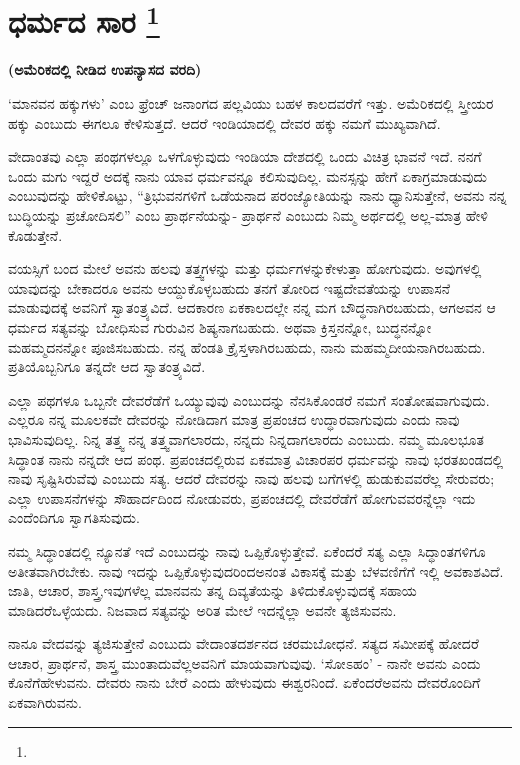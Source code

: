 
\vspace{-0.8cm}

\chapter[ಧರ್ಮದ ಸಾರ ]{ಧರ್ಮದ ಸಾರ \protect\footnote{}}

\centerline{\textbf{(ಅಮೆರಿಕದಲ್ಲಿ ನೀಡಿದ ಉಪನ್ಯಾಸದ ವರದಿ)}}

‘ಮಾನವನ ಹಕ್ಕುಗಳು’ ಎಂಬ ಫ್ರೆಂಚ್​ ಜನಾಂಗದ ಪಲ್ಲವಿಯು ಬಹಳ ಕಾಲದವರೆಗೆ ಇತ್ತು. ಅಮೆರಿಕದಲ್ಲಿ ಸ್ತ್ರೀಯರ ಹಕ್ಕು ಎಂಬುದು ಈಗಲೂ ಕೇಳಿಸುತ್ತದೆ. ಆದರೆ ಇಂಡಿಯಾದಲ್ಲಿ ದೇವರ ಹಕ್ಕು ನಮಗೆ ಮುಖ್ಯವಾಗಿದೆ.

ವೇದಾಂತವು ಎಲ್ಲಾ ಪಂಥಗಳಲ್ಲೂ ಒಳಗೊಳ್ಳುವುದು ಇಂಡಿಯಾ ದೇಶದಲ್ಲಿ ಒಂದು ವಿಚಿತ್ರ ಭಾವನೆ ಇದೆ. ನನಗೆ ಒಂದು ಮಗು ಇದ್ದರೆ ಅದಕ್ಕೆ ನಾನು ಯಾವ ಧರ್ಮವನ್ನೂ ಕಲಿಸುವುದಿಲ್ಲ. ಮನಸ್ಸನ್ನು ಹೇಗೆ ಏಕಾಗ್ರಮಾಡುವುದು ಎಂಬುವುದನ್ನು ಹೇಳಿಕೊಟ್ಟು, “ತ್ರಿಭುವನಗಳಿಗೆ ಒಡೆಯನಾದ ಪರಂಜ್ಯೋತಿಯನ್ನು ನಾನು ಧ್ಯಾನಿಸುತ್ತೇನೆ, ಅವನು ನನ್ನ ಬುದ್ಧಿಯನ್ನು ಪ್ರಚೋದಿಸಲಿ” ಎಂಬ ಪ್ರಾರ್ಥನೆಯನ್ನು- ಪ್ರಾರ್ಥನೆ ಎಂಬುದು ನಿಮ್ಮ ಅರ್ಥದಲ್ಲಿ ಅಲ್ಲ-ಮಾತ್ರ ಹೇಳಿ ಕೊಡುತ್ತೇನೆ.

ವಯಸ್ಸಿಗೆ ಬಂದ ಮೇಲೆ ಅವನು ಹಲವು ತತ್ತ್ವಗಳನ್ನು ಮತ್ತು ಧರ್ಮಗಳನ್ನು\break ಕೇಳುತ್ತಾ ಹೋಗುವುದು. ಅವುಗಳಲ್ಲಿ ಯಾವುದನ್ನು ಬೇಕಾದರೂ ಅವನು ಆಯ್ದುಕೊಳ್ಳ\-ಬಹುದು ತನಗೆ ತೋರಿದ ಇಷ್ಟದೇವತೆಯನ್ನು ಉಪಾಸನೆ ಮಾಡುವುದಕ್ಕೆ ಅವನಿಗೆ ಸ್ವಾತಂತ್ರ್ಯವಿದೆ. ಆದಕಾರಣ ಏಕಕಾಲದಲ್ಲೇ ನನ್ನ ಮಗ ಬೌದ್ಧನಾಗಿರಬಹುದು, ಆಗ\break ಅವನ ಆ ಧರ್ಮದ ಸತ್ಯವನ್ನು ಬೋಧಿಸುವ ಗುರುವಿನ ಶಿಷ್ಯನಾಗಬಹುದು. ಅಥವಾ ಕ್ರಿಸ್ತನನ್ನೋ, ಬುದ್ಧನನ್ನೋ ಮಹಮ್ಮದನನ್ನೋ ಪೂಜಿಸಬಹುದು. ನನ್ನ ಹೆಂಡತಿ ಕ್ರೈಸ್ತಳಾಗಿರ\break ಬಹುದು, ನಾನು ಮಹಮ್ಮದೀಯನಾಗಿರಬಹುದು. ಪ್ರತಿಯೊಬ್ಬನಿಗೂ ತನ್ನದೇ ಆದ ಸ್ವಾತಂತ್ರ್ಯವಿದೆ.

ಎಲ್ಲಾ ಪಥಗಳೂ ಒಬ್ಬನೇ ದೇವರೆಡೆಗೆ ಒಯ್ಯುವುವು ಎಂಬುದನ್ನು ನೆನಸಿಕೊಂಡರೆ ನಮಗೆ ಸಂತೋಷವಾಗುವುದು. ಎಲ್ಲರೂ ನನ್ನ ಮೂಲಕವೇ ದೇವರನ್ನು ನೋಡಿದಾಗ ಮಾತ್ರ ಪ್ರಪಂಚದ ಉದ್ಧಾರವಾಗುವುದು ಎಂದು ನಾವು ಭಾವಿಸುವುದಿಲ್ಲ. ನಿನ್ನ ತತ್ತ್ವ ನನ್ನ ತತ್ತ್ವವಾಗಲಾರದು, ನನ್ನದು ನಿನ್ನದಾಗಲಾರದು ಎಂಬುದು. ನಮ್ಮ ಮೂಲಭೂತ ಸಿದ್ಧಾಂತ ನಾನು ನನ್ನದೇ ಆದ ಪಂಥ. ಪ್ರಪಂಚದಲ್ಲಿರುವ ಏಕಮಾತ್ರ ವಿಚಾರಪರ ಧರ್ಮವನ್ನು ನಾವು ಭರತಖಂಡದಲ್ಲಿ ನಾವು ಸೃಷ್ಟಿಸಿರುವೆವು ಎಂಬುದು ಸತ್ಯ. ಆದರೆ ದೇವರನ್ನು ನಾವು ಹಲವು ಬಗೆಗಳಲ್ಲಿ ಹುಡುಕುವವರೆಲ್ಲ ಸೇರುವರು; ಎಲ್ಲಾ ಉಪಾಸನೆಗಳನ್ನು ಸೌಹಾರ್ದದಿಂದ ನೋಡುವರು, ಪ್ರಪಂಚದಲ್ಲಿ ದೇವರೆಡೆಗೆ ಹೋಗುವವರನ್ನೆಲ್ಲಾ ಇದು ಎಂದೆಂದಿಗೂ ಸ್ವಾಗತಿಸುವುದು.

ನಮ್ಮ ಸಿದ್ಧಾಂತದಲ್ಲಿ ನ್ಯೂನತೆ ಇದೆ ಎಂಬುದನ್ನು ನಾವು ಒಪ್ಪಿಕೊಳ್ಳುತ್ತೇವೆ. ಏಕೆಂದರೆ ಸತ್ಯ ಎಲ್ಲಾ ಸಿದ್ಧಾಂತಗಳಿಗೂ ಅತೀತವಾಗಿರಬೇಕು. ನಾವು ಇದನ್ನು ಒಪ್ಪಿಕೊಳ್ಳುವುದರಿಂದ\break ಅನಂತ ವಿಕಾಸಕ್ಕೆ ಮತ್ತು ಬೆಳವಣಿಗೆಗೆ ಇಲ್ಲಿ ಅವಕಾಶವಿದೆ. ಜಾತಿ, ಆಚಾರ, ಶಾಸ್ತ್ರ,\break ಇವುಗಳೆಲ್ಲ ಮಾನವನು ತನ್ನ ದಿವ್ಯತೆಯನ್ನು ತಿಳಿದುಕೊಳ್ಳುವುದಕ್ಕೆ ಸಹಾಯ ಮಾಡಿದರೆ\break ಒಳ್ಳೆಯದು. ನಿಜವಾದ ಸತ್ಯವನ್ನು ಅರಿತ ಮೇಲೆ ಇದನ್ನೆಲ್ಲಾ ಅವನೇ ತ್ಯಜಿಸುವನು.

ನಾನೂ ವೇದವನ್ನು ತ್ಯಜಿಸುತ್ತೇನೆ ಎಂಬುದು ವೇದಾಂತದರ್ಶನದ ಚರಮ\break ಬೋಧನೆ. ಸತ್ಯದ ಸಮೀಪಕ್ಕೆ ಹೋದರೆ ಆಚಾರ, ಪ್ರಾರ್ಥನೆ, ಶಾಸ್ತ್ರ ಮುಂತಾದುವೆಲ್ಲ\break ಅವನಿಗೆ ಮಾಯವಾಗುವುವು. ‘ಸೋಽಹಂ’ - ನಾನೇ ಅವನು ಎಂದು ಕೊನೆಗೆ\break ಹೇಳುವನು. ದೇವರು ನಾನು ಬೇರೆ ಎಂದು ಹೇಳುವುದು ಈಶ್ವರನಿಂದೆ. ಏಕೆಂದರೆ\break ಅವನು ದೇವರೊಂದಿಗೆ ಏಕವಾಗಿರುವನು.


